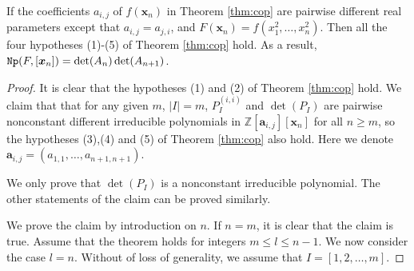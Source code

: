 \documentclass[amsthm]{elsart}
\def  \Nproj {{\tt Np}}
\def \ZZ {{\mathbb Z}}
\newcommand{\xx}{\bm{x}}
\begin{document}
\begin{comment}
Suppose $f(\xx_n)=(\xx_n,1)A_{n+1}(\xx_n,1)^T$, set $F(\xx_n)=f(x_1^2,\ldots,x_n^2)$. If the coefficients $a_{i,j}$ of $f(\xx_{n})$ in Theorem \ref{thm:cop} are pairwise different real parameters except that $a_{i,j}=a_{j,i}$. We now show that the hypotheses (3) and (4) also hold. \end{comment}
\begin{thm}\label{thm:gcop}
If the coefficients $a_{i,j}$ of $f(\xx_{n})$ in Theorem \ref{thm:cop} are pairwise different real parameters except that $a_{i,j}=a_{j,i}$, and $F(\xx_n)=f(x_1^2,\ldots,x_n^2)$. Then all the four hypotheses (1)-(5) of Theorem \ref{thm:cop} hold. As a result, $\Nproj(F,[\xx_n])=\det(A_{n})\det(A_{n+1})$. \end{thm}
\begin{proof}
  It is clear that the hypotheses (1) and (2) of Theorem \ref{thm:cop} hold. We claim that that for any given $m$, $|I|=m$, $P_{I}^{(i,i)}$ and $\det(P_{I})$ are pairwise nonconstant different irreducible polynomials in $\ZZ[\bm{a}_{i,j}][\xx_n]$ for all $n\ge m$, so the hypotheses (3),(4) and (5) of Theorem \ref{thm:cop} also hold. Here we denote $\bm{a}_{i,j}=(a_{1,1},\ldots,a_{n+1,n+1})$.

  We only prove that $\det(P_{I})$ is a nonconstant irreducible polynomial. The other statements of the claim can be proved similarly.

We prove the claim by introduction on $n$. If $n=m$, it is clear that the claim is true. Assume that the theorem holds for integers $m\le l\le n-1$. We now consider the case $l=n$. Without of loss of generality, we assume that $I=[1,2,\ldots,m]$.



\end{proof}
\end{document}

